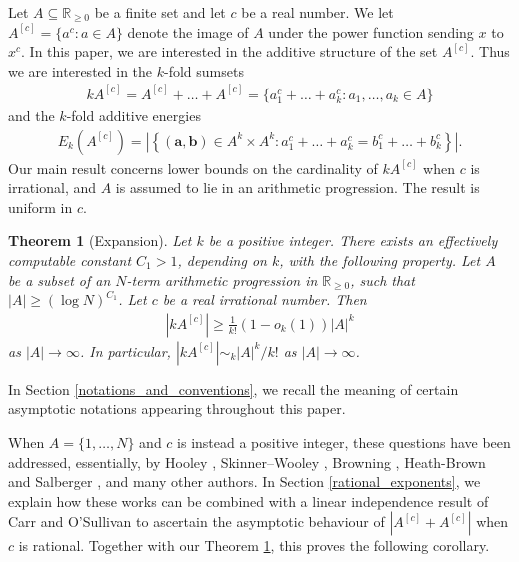 \documentclass[9pt]{amsart}
\theoremstyle{my_theorem_style}
\numberwithin{definition}{section}
\newtheorem{theorem}[definition]{Theorem}
\newcommand{\R}{\mathbb{R}}
\renewcommand{\vec}[1]{\bm{#1}}
\begin{document}
Let $A \subseteq \R_{\geq 0}$ be a finite set and let $c$ be a real number. We let $A^{[c]} = \{a^c : a \in A\}$ denote the image of $A$ under the power function sending $x$ to $x^c$. In this paper, we are interested in the additive structure of the set $A^{[c]}$. Thus we are interested in the $k$-fold sumsets
\begin{align*}
    k A^{[c]} = A^{[c]} + \dots + A^{[c]} =
    \{a_1^c + \dots + a_k^c : a_1, \dots, a_k \in A\}
\end{align*}
and the $k$-fold additive energies
\begin{align*}
    E_k(A^{[c]}) = 
    \left|
    \left\{
    (\vec{a}, \vec{b}) \in A^k \times A^k :
    a_1^c + \dots + a_k^c = 
    b_1^c + \dots + b_k^c
    \right\}
    \right|.
\end{align*}
Our main result concerns lower bounds on the cardinality of $k A^{[c]}$ when $c$ is irrational, and $A$ is assumed to lie in an arithmetic progression. The result is uniform in $c$.

\begin{theorem}
[Expansion]
\label{expansion}
    Let $k$ be a positive integer. There exists an effectively computable constant $C_1 > 1$, depending on $k$, with the following property. Let $A$ be a subset of an $N$-term arithmetic progression in $\R_{\geq 0}$, such that $|A| \geq (\log N)^{C_1}$. Let $c$ be a real irrational number. Then
    \begin{align*}
        |k A^{[c]}| \geq \frac{1}{k!}(1 - o_k(1))|A|^k
    \end{align*}
    as $|A| \to \infty$. In particular, $|k A^{[c]}| \sim_k |A|^k/k!$ as $|A| \to \infty$.
\end{theorem}

In Section \ref{notations_and_conventions}, we recall the meaning of certain asymptotic notations appearing throughout this paper.

When $A = \{1, \dots, N\}$ and $c$ is instead a positive integer, these questions have been addressed, essentially, by Hooley \cite{Hooley_on_the_representations_of_a_number_as_a_sum_of_two_cubes, Hooley_on_the_numbers_that_are_representable_as_the_sum_of_two_cubes, Hooley_on_the_representation_of_a_number_as_the_sum_of_two_h-th_powers, Hooley_on_another_sieve_method_and_the_numbers_that_are_a_sum_of_two_h-th_powers}, Skinner--Wooley \cite{Skinner--Wooley_sums_of_two_kth_powers}, Browning \cite{Browning_equal_sums_of_two_kth_powers}, Heath-Brown \cite{Heath-Brown_the_density_of_rational_points_on_curves_and_surfaces, Heath-Brown_Cayleys_cubic} and Salberger \cite{Salberger_counting_rational_points_on_projective_varieties}, and many other authors. In Section \ref{rational_exponents}, we explain how these works can be combined with a linear independence result of Carr and O'Sullivan \cite{Carr--O'Sullivan_on_the_linear_independence_of_roots} to ascertain the asymptotic behaviour of $|A^{[c]} + A^{[c]}|$ when $c$ is rational. Together with our Theorem \ref{expansion}, this proves the following corollary.
\end{document}
